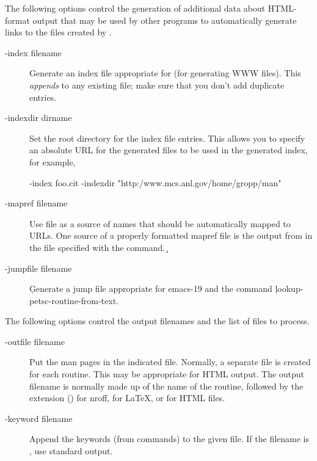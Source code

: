 \documentclass[twoside]{../texlocal/linfoem}
\begin{document}
The following options control the generation of additional data about
HTML-format 
output that may be used by other programs to automatically generate links to
the files created by .
\begin{description}
\item[-index filename]
Generate an index file appropriate for  \cite{tohtml} (for
generating WWW files). 
This {\em appends} to any existing file; make sure that you don't add
duplicate entries.
\item[-indexdir dirname]
Set the root directory for the index file entries.  This allows you to 
specify an absolute URL for the generated files to be used in the generated
index,  for example, 
\begin{example}
-index foo.cit -indexdir "http:/www.mcs.anl.gov/home/gropp/man"
\end{example}
\item[-mapref filename]Use file  as a source of names that
  should be automatically mapped to URLs.  One source of a properly formatted
  mapref file is the output from  in the file specified with the
   command.
\c \item[-jumpfile filename]
\c Generate a jump file appropriate for emacs-19 and the command 
\c lookup-petsc-routine-from-text.  
\end{description}

The following options control the output filenames and the list of files to process.
\begin{description}
\item[-outfile filename]
Put the man pages in the indicated file.  Normally, a separate file is
created for each routine.  This may be appropriate for HTML output.
The output filename is normally made up of the name of the routine, followed
by the extension () for nroff,  for LaTeX, or
 for HTML files.
\item[-keyword filename]
Append the keywords (from  commands) to the given file.  If the
filename is \file{-}, use standard output.
\end{description}
\end{document}
